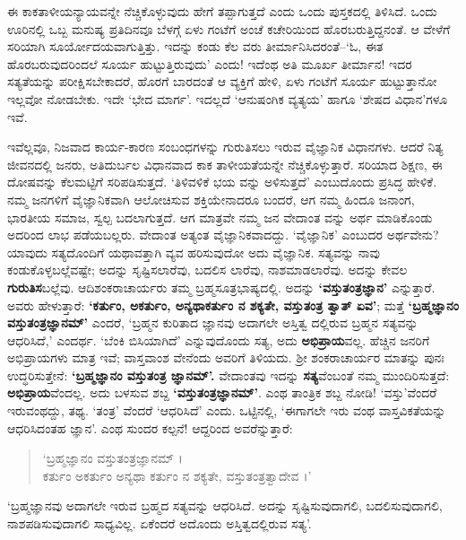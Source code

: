 ಈ ಕಾಕತಾಳೀಯನ್ಯಾಯವನ್ನೇ ನೆಚ್ಚಿಕೊಳ್ಳುವುದು ಹೇಗೆ ತಪ್ಪಾಗುತ್ತದೆ ಎಂದು ಒಂದು ಪುಸ್ತಕದಲ್ಲಿ ತಿಳಿಸಿದೆ. ಒಂದು ಊರಿನಲ್ಲಿ ಒಬ್ಬ ಮನುಷ್ಯ ಪ್ರತಿದಿನವೂ ಬೆಳಗ್ಗೆ ಏಳು ಗಂಟೆಗೆ ಅಂಚೆ ಕಚೇರಿಯಿಂದ ಹೊರಬರುತ್ತಿದ್ದನಂತೆ. ಆ ವೇಳೆಗೆ ಸರಿಯಾಗಿ ಸೂರ್ಯೋದಯವಾಗುತ್ತಿತ್ತು. ಇದನ್ನು ಕಂಡು ಕೆಲ ವರು ತೀರ್ಮಾನಿಸಿದರಂತೆ–‘ಓ, ಈತ ಹೊರಬರುವುದರಿಂದಲೆ ಸೂರ್ಯ ಹುಟ್ಟುತ್ತಿರುವುದು’ ಎಂದು! ಇದೆಂಥ ಅತಿ ಮೂರ್ಖ ತೀರ್ಮಾನ! ಇದರ ಸತ್ಯತೆಯನ್ನು ಪರೀಕ್ಷಿಸಬೇಕಾದರೆ, ಹೊರಗೆ ಬಾರದಂತೆ ಆ ವ್ಯಕ್ತಿಗೆ ಹೇಳಿ, ಏಳು ಗಂಟೆಗೆ ಸೂರ್ಯ ಹುಟ್ಟುತ್ತಾನೋ ಇಲ್ಲವೋ ನೋಡಬೇಕು. ಇದೇ ‘ಭೇದ ಮಾರ್ಗ’. ಇದಲ್ಲದೆ ‘ಆನುಷಂಗಿಕ ವ್ಯತ್ಯಯ’ ಹಾಗೂ ‘ಶೇಷದ ವಿಧಾನ’ಗಳೂ ಇವೆ. 

ಇವೆಲ್ಲವೂ, ನಿಜವಾದ ಕಾರ್ಯ-ಕಾರಣ ಸಂಬಂಧಗಳನ್ನು ಗುರುತಿಸಲು ಇರುವ ವೈಜ್ಞಾನಿಕ ವಿಧಾನಗಳು. ಆದರೆ ನಿತ್ಯ ಜೀವನದಲ್ಲಿ ಜನರು, ಅತಿದುರ್ಬಲ ವಿಧಾನವಾದ ಕಾಕ ತಾಳೀಯತೆಯನ್ನೇ ನೆಚ್ಚಿಕೊಳ್ಳುತ್ತಾರೆ. ಸರಿಯಾದ ಶಿಕ್ಷಣ, ಈ ದೋಷವನ್ನು ಕೆಲಮಟ್ಟಿಗೆ ಸರಿಪಡಿಸುತ್ತದೆ. ‘ತಿಳಿವಳಿಕೆ ಭಯ ವನ್ನು ಅಳಿಸುತ್ತದೆ’ ಎಂಬುದೊಂದು ಪ್ರಸಿದ್ಧ ಹೇಳಿಕೆ. ನಮ್ಮ ಜನಗಳಿಗೆ ವೈಜ್ಞಾನಿಕವಾಗಿ ಆಲೋಚಿಸುವ ಶಕ್ತಿಯೇನಾದರೂ ಬಂದರೆ, ಆಗ ನಮ್ಮ ಹಿಂದೂ ಜನಾಂಗ, ಭಾರತೀಯ ಸಮಾಜ, ಸ್ವಲ್ಪ ಬದಲಾಗುತ್ತದೆ. ಆಗ ಮಾತ್ರವೇ ನಮ್ಮ ಜನ ವೇದಾಂತ ವನ್ನು ಅರ್ಥ ಮಾಡಿಕೊಂಡು ಅದರಿಂದ ಲಾಭ ಪಡೆಯಬಲ್ಲರು. ವೇದಾಂತ ಅತ್ಯಂತ ವೈಜ್ಞಾನಿಕವಾದದ್ದು. ‘ವೈಜ್ಞಾನಿಕ’ ಎಂಬುದರ ಅರ್ಥವೇನು? ಯಾವುದು ಸತ್ಯದೊಂದಿಗೆ ಯಥಾವತ್ತಾಗಿ ವ್ಯವ ಹರಿಸುವುದೋ ಅದು ವೈಜ್ಞಾನಿಕ. ಸತ್ಯವನ್ನು ನಾವು ಕಂಡುಕೊಳ್ಳಬಲ್ಲೆವಷ್ಟೇ; ಅದನ್ನು ಸೃಷ್ಟಿಸಲಾರೆವು, ಬದಲಿಸ ಲಾರೆವು, ನಾಶಮಾಡಲಾರೆವು. ಅದನ್ನು ಕೇವಲ \textbf{ಗುರುತಿಸ}ಬಲ್ಲೆವು. ಆದಿಶಂಕರಾಚಾರ್ಯರು ತಮ್ಮ ಬ್ರಹ್ಮಸೂತ್ರಭಾಷ್ಯದಲ್ಲಿ. ಅದನ್ನು \textbf{‘ವಸ್ತುತಂತ್ರಜ್ಞಾನ’} ಎನ್ನುತ್ತಾರೆ. ಅವರು ಹೇಳುತ್ತಾರೆ: \textbf{‘ಕರ್ತುಂ, ಅಕರ್ತುಂ, ಅನ್ಯಥಾಕರ್ತುಂ ನ ಶಕ್ಯತೇ, ವಸ್ತುತಂತ್ರ ತ್ವಾತ್ ಏವ’}; ಮತ್ತೆ \textbf{‘ಬ್ರಹ್ಮಜ್ಞಾನಂ ವಸ್ತುತಂತ್ರಜ್ಞಾನಮ್​’} ಎಂದರೆ, ‘ಬ್ರಹ್ಮನ ಕುರಿತಾದ ಜ್ಞಾನವು ಅದಾಗಲೇ ಅಸ್ತಿತ್ವ ದಲ್ಲಿರುವ ಬ್ರಹ್ಮನ ಸತ್ಯವನ್ನು ಆಧರಿಸಿದೆ,’ ಎಂದರ್ಥ. ‘ಬೆಂಕಿ ಬಿಸಿಯಾಗಿದೆ’ ಎನ್ನುವುದೊಂದು ಸತ್ಯ, ಅದು \textbf{ಅಭಿಪ್ರಾಯ}ವಲ್ಲ. ಹೆಚ್ಚಿನ ಜನರಿಗೆ ಅಭಿಪ್ರಾಯಗಳು ಮಾತ್ರ ಇವೆ; ವಾಸ್ತವಾಂಶ ವೇನೆಂದು ಅವರಿಗೆ ತಿಳಿಯದು. ಶ್ರೀ ಶಂಕರಾಚಾರ್ಯರ ಮಾತನ್ನು ಪುನಃ ಉದ್ಧರಿಸುತ್ತೇನೆ: \textbf{‘ಬ್ರಹ್ಮಜ್ಞಾನಂ ವಸ್ತುತಂತ್ರ ಜ್ಞಾನಮ್​’.} ವೇದಾಂತವು ಇದನ್ನು \textbf{ಸತ್ಯ}ವೆಂಬಂತೆ ನಮ್ಮ ಮುಂದಿರಿಸುತ್ತದೆ: \textbf{ಅಭಿಪ್ರಾಯ}ವೆಂದಲ್ಲ. ಅದು ಬಳಸುವ ಶಬ್ದ \textbf{‘ವಸ್ತುತಂತ್ರಜ್ಞಾನಮ್​’}. ಎಂಥ ತಾಂತ್ರಿಕ  ಶಬ್ದ ನೋಡಿ! ‘ವಸ್ತು’ವೆಂದರೆ ಇರುವಂಥದ್ದು, ತಥ್ಯ. ‘ತಂತ್ರ’ ವೆಂದರೆ ‘ಆಧರಿಸಿದೆ’ ಎಂದು. ಒಟ್ಟಿನಲ್ಲಿ, ‘ಈಗಾಗಲೇ ಇರು ವಂಥ ವಾಸ್ತವಿಕತೆಯನ್ನು ಆಧರಿಸಿದಂತಹ ಜ್ಞಾನ’. ಎಂಥ ಸುಂದರ ಕಲ್ಪನೆ! ಆದ್ದರಿಂದ ಅವರೆನ್ನುತ್ತಾರೆ:

\begin{verse}
‘ಬ್ರಹ್ಮಜ್ಞಾನಂ ವಸ್ತುತಂತ್ರಜ್ಞಾನಮ್ ।\\ಕರ್ತುಂ ಅಕರ್ತುಂ ಅನ್ಯಥಾ ಕರ್ತುಂ ನ ಶಕ್ಯತೇ, ವಸ್ತುತಂತ್ರತ್ವಾದೇವ ।’
\end{verse}

‘ಬ್ರಹ್ಮಜ್ಞಾನವು ಅದಾಗಲೇ ಇರುವ ಬ್ರಹ್ಮದ ಸತ್ಯವನ್ನು ಆಧರಿಸಿದೆ. ಅದನ್ನು ಸೃಷ್ಟಿಸುವುದಾಗಲಿ, ಬದಲಿಸುವುದಾಗಲಿ, ನಾಶಪಡಿಸುವುದಾಗಲಿ ಸಾಧ್ಯವಿಲ್ಲ. ಏಕೆಂದರೆ ಅದೊಂದು ಅಸ್ತಿತ್ವದಲ್ಲಿರುವ ಸತ್ಯ’.


